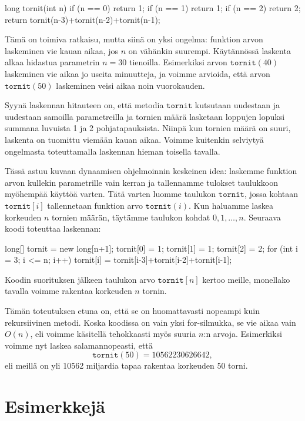 \begin{code}
long tornit(int n) {
    if (n == 0) return 1;
    if (n == 1) return 1;
    if (n == 2) return 2;
    return tornit(n-3)+tornit(n-2)+tornit(n-1);
}
\end{code}

Tämä on toimiva ratkaisu, mutta siinä on yksi ongelma:
funktion arvon laskeminen vie kauan aikaa, jos $n$ on
vähänkin suurempi.
Käytännössä laskenta alkaa hidastua parametrin $n=30$ tienoilla.
Esimerkiksi arvon $\texttt{tornit}(40)$ laskeminen vie aikaa
jo useita minuutteja, ja voimme arvioida, että
arvon $\texttt{tornit}(50)$ laskeminen veisi aikaa noin vuorokauden.

Syynä laskennan hitauteen on, että metodia $\texttt{tornit}$
kutsutaan uudestaan ja uudestaan samoilla parametreilla
ja tornien määrä lasketaan loppujen lopuksi summana
luvuista 1 ja 2 pohjatapauksista.
Niinpä kun tornien määrä on suuri,
laskenta on tuomittu viemään kauan aikaa.
Voimme kuitenkin selviytyä ongelmasta toteuttamalla
laskennan hieman toisella tavalla.

Tässä astuu kuvaan dynaamisen ohjelmoinnin keskeinen idea:
laskemme funktion arvon kullekin parametrille vain kerran
ja tallennamme tulokset taulukkoon myöhempää käyttöä varten.
Tätä varten luomme taulukon $\texttt{tornit}$,
jossa kohtaan $\texttt{tornit}[i]$ tallennetaan funktion
arvo $\texttt{tornit}(i)$.
Kun haluamme laskea korkeuden $n$ tornien määrän,
täytämme taulukon kohdat $0,1,\dots,n$.
Seuraava koodi toteuttaa laskennan:

\begin{code}
long[] tornit = new long[n+1];
tornit[0] = 1;
tornit[1] = 1;
tornit[2] = 2;
for (int i = 3; i <= n; i++) {
    tornit[i] = tornit[i-3]+tornit[i-2]+tornit[i-1];
}
\end{code}

Koodin suorituksen jälkeen taulukon arvo $\texttt{tornit}[n]$
kertoo meille, monellako tavalla voimme rakentaa
korkeuden $n$ tornin.

Tämän toteutuksen etuna on, että se on huomattavasti
nopeampi kuin rekursiivinen metodi.
Koska koodissa on vain yksi for-silmukka, se vie aikaa
vain $O(n)$, eli voimme käsitellä tehokkaasti myös
suuria $n$:n arvoja.
Esimerkiksi voimme nyt laskea salamannopeasti, että
\[
\texttt{tornit}(50) = 10562230626642,
\]
eli meillä on yli 10562 miljardia tapaa rakentaa korkeuden 50 torni.

\section{Esimerkkejä}


